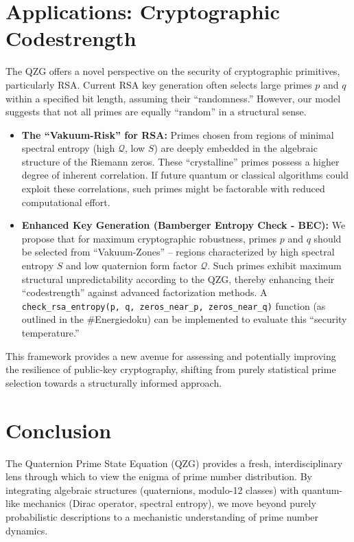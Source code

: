 \documentclass[11pt,a4paper]{article}
\newcommand{\entropy}{S}
\newcommand{\formfactor}{\mathcal{Q}}
\theoremstyle{definition}
\begin{document}
\section{Applications: Cryptographic Codestrength}
\label{sec:applications}
The QZG offers a novel perspective on the security of cryptographic primitives, particularly RSA. Current RSA key generation often selects large primes $p$ and $q$ within a specified bit length, assuming their ``randomness.'' However, our model suggests that not all primes are equally ``random'' in a structural sense.

\begin{itemize}
    \item \textbf{The ``Vakuum-Risk'' for RSA:} Primes chosen from regions of minimal spectral entropy (high $\formfactor$, low $\entropy$) are deeply embedded in the algebraic structure of the Riemann zeros. These ``crystalline'' primes possess a higher degree of inherent correlation. If future quantum or classical algorithms could exploit these correlations, such primes might be factorable with reduced computational effort.
    \item \textbf{Enhanced Key Generation (Bamberger Entropy Check - BEC):} We propose that for maximum cryptographic robustness, primes $p$ and $q$ should be selected from ``Vakuum-Zones'' -- regions characterized by high spectral entropy $\entropy$ and low quaternion form factor $\formfactor$. Such primes exhibit maximum structural unpredictability according to the QZG, thereby enhancing their ``codestrength'' against advanced factorization methods. A \texttt{check\_rsa\_entropy(p, q, zeros\_near\_p, zeros\_near\_q)} function (as outlined in the \#Energiedoku) can be implemented to evaluate this ``security temperature.''
\end{itemize}
This framework provides a new avenue for assessing and potentially improving the resilience of public-key cryptography, shifting from purely statistical prime selection towards a structurally informed approach.

\section{Conclusion}
\label{sec:conclusion}
The Quaternion Prime State Equation (QZG) provides a fresh, interdisciplinary lens through which to view the enigma of prime number distribution. By integrating algebraic structures (quaternions, modulo-12 classes) with quantum-like mechanics (Dirac operator, spectral entropy), we move beyond purely probabilistic descriptions to a mechanistic understanding of prime number dynamics.
\end{document}
